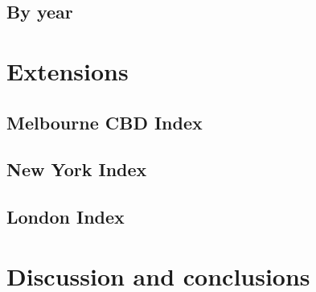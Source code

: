 \documentclass[preprint, 3p,
authoryear]{elsarticle} %
\begin{document}
\hypertarget{by-year}{%
\subsection{By year}\label{by-year}}

\hypertarget{extensions}{%
\section{Extensions}\label{extensions}}

\hypertarget{melbourne-cbd-index}{%
\subsection{Melbourne CBD Index}\label{melbourne-cbd-index}}

\hypertarget{new-york-index}{%
\subsection{New York Index}\label{new-york-index}}

\hypertarget{london-index}{%
\subsection{London Index}\label{london-index}}

\hypertarget{discussion-and-conclusions}{%
\section{Discussion and conclusions}\label{discussion-and-conclusions}}

\renewcommand\refname{References}

\end{document}
